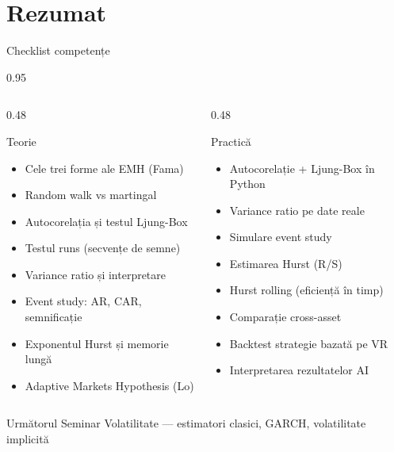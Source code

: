 \documentclass[9pt, aspectratio=169, t]{beamer}
\begin{document}
\section{Rezumat}

\begin{frame}{Checklist competențe}
    \begin{cminipage}{0.95\textwidth}
\begin{columns}[T]
\begin{column}{0.48\textwidth}
\begin{block}{Teorie}
\begin{itemize}\setlength{\itemsep}{0pt}
    \item[$\square$] Cele trei forme ale EMH (Fama)
    \item[$\square$] Random walk vs martingal
    \item[$\square$] Autocorelația și testul Ljung-Box
    \item[$\square$] Testul runs (secvențe de semne)
    \item[$\square$] Variance ratio și interpretare
    \item[$\square$] Event study: AR, CAR, semnificație
    \item[$\square$] Exponentul Hurst și memorie lungă
    \item[$\square$] Adaptive Markets Hypothesis (Lo)
\end{itemize}
\end{block}
\end{column}
\begin{column}{0.48\textwidth}
\begin{block}{Practică}
\begin{itemize}\setlength{\itemsep}{0pt}
    \item[$\square$] Autocorelație + Ljung-Box în Python
    \item[$\square$] Variance ratio pe date reale
    \item[$\square$] Simulare event study
    \item[$\square$] Estimarea Hurst (R/S)
    \item[$\square$] Hurst rolling (eficiență în timp)
    \item[$\square$] Comparație cross-asset
    \item[$\square$] Backtest strategie bazată pe VR
    \item[$\square$] Interpretarea rezultatelor AI
\end{itemize}
\end{block}
\end{column}
\end{columns}

    \vspace{0.3cm}
    \begin{block}{Următorul Seminar}
        Volatilitate --- estimatori clasici, GARCH, volatilitate implicită
    \end{block}
    \end{cminipage}
\end{frame}
\end{document}
